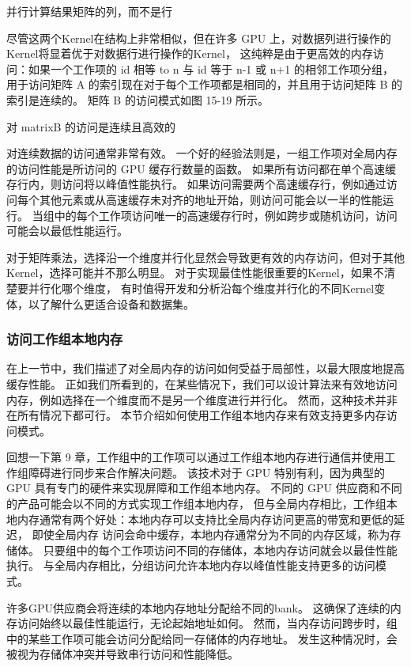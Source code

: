 {\color{red} 并行计算结果矩阵的列，而不是行}

尽管这两个Kernel在结构上非常相似，但在许多 GPU 上，对数据列进行操作的Kernel将显着优于对数据行进行操作的Kernel，
这纯粹是由于更高效的内存访问：如果一个工作项的 id 相等 to n 与 id 等于 n-1 或 n+1 的相邻工作项分组，
用于访问矩阵 A 的索引现在对于每个工作项都是相同的，并且用于访问矩阵 B 的索引是连续的。 
矩阵 B 的访问模式如图 15-19 所示。

{\color{red} 对 matrixB 的访问是连续且高效的}

对连续数据的访问通常非常有效。 一个好的经验法则是，一组工作项对全局内存的访问性能是所访问的 GPU 缓存行数量的函数。 
如果所有访问都在单个高速缓存行内，则访问将以峰值性能执行。 
如果访问需要两个高速缓存行，例如通过访问每个其他元素或从高速缓存未对齐的地址开始，则访问可能会以一半的性能运行。 
当组中的每个工作项访问唯一的高速缓存行时，例如跨步或随机访问，访问可能会以最低性能运行。

\begin{remark}[分析Kernel变体]
对于矩阵乘法，选择沿一个维度并行化显然会导致更有效的内存访问，但对于其他Kernel，选择可能并不那么明显。
对于实现最佳性能很重要的Kernel，如果不清楚要并行化哪个维度，
有时值得开发和分析沿每个维度并行化的不同Kernel变体，以了解什么更适合设备和数据集。
\end{remark}

\subsubsection{访问工作组本地内存}
在上一节中，我们描述了对全局内存的访问如何受益于局部性，以最大限度地提高缓存性能。 
正如我们所看到的，在某些情况下，我们可以设计算法来有效地访问内存，例如选择在一个维度而不是另一个维度进行并行化。 
然而，这种技术并非在所有情况下都可行。 本节介绍如何使用工作组本地内存来有效支持更多内存访问模式。

回想一下第 9 章，工作组中的工作项可以通过工作组本地内存进行通信并使用工作组障碍进行同步来合作解决问题。 
该技术对于 GPU 特别有利，因为典型的 GPU 具有专门的硬件来实现屏障和工作组本地内存。 
不同的 GPU 供应商和不同的产品可能会以不同的方式实现工作组本地内存，
但与全局内存相比，工作组本地内存通常有两个好处：本地内存可以支持比全局内存访问更高的带宽和更低的延迟，
即使全局内存 访问会命中缓存，本地内存通常分为不同的内存区域，称为存储体。 
只要组中的每个工作项访问不同的存储体，本地内存访问就会以最佳性能执行。 
与全局内存相比，分组访问允许本地内存以峰值性能支持更多的访问模式。

许多GPU供应商会将连续的本地内存地址分配给不同的bank。 这确保了连续的内存访问始终以最佳性能运行，无论起始地址如何。 
然而，当内存访问跨步时，组中的某些工作项可能会访问分配给同一存储体的内存地址。 
发生这种情况时，会被视为存储体冲突并导致串行访问和性能降低。

